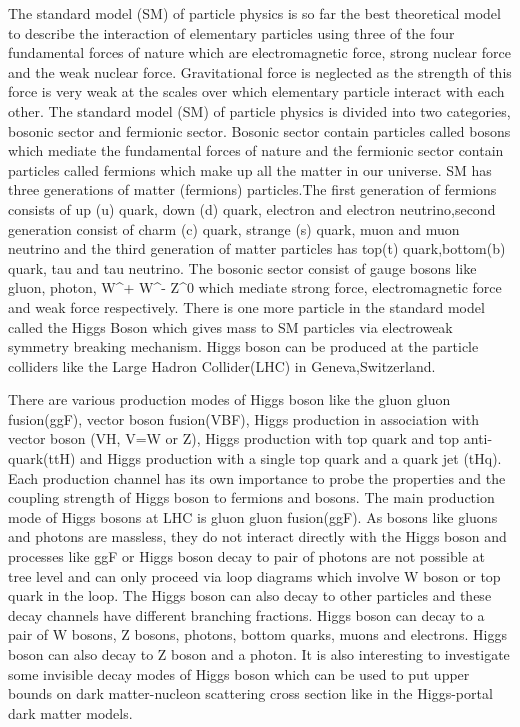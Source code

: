 \documentclass[final,3p]{CSP}
\begin{document}
The standard model (SM) of particle physics is so far the best theoretical model to describe the interaction of elementary 
particles using three of the four fundamental forces of nature which are electromagnetic force, strong nuclear force and the weak
nuclear force. Gravitational force is neglected as the strength of this force is very weak at the scales over which elementary 
particle interact with each other. The standard model (SM) of particle physics is divided into two categories, bosonic sector 
and fermionic sector. Bosonic sector contain particles called bosons which mediate the fundamental forces of nature and the
fermionic sector contain particles called fermions which make up all the matter in our universe. SM has three generations of 
matter (fermions) particles.The first generation of fermions consists of up (u) quark, down (d) quark, electron and electron 
neutrino,second generation consist of charm (c) quark, strange (s) quark, muon and muon neutrino and the third generation of matter 
particles has top(t) quark,bottom(b) quark, tau and tau neutrino. The bosonic sector consist of gauge bosons like gluon, photon, 
W^+ W^- Z^0 which mediate strong force, electromagnetic force and weak force respectively. There is one more particle in the 
standard model called the Higgs Boson which gives mass to SM particles via electroweak symmetry breaking mechanism. Higgs boson 
can be produced at the particle colliders like the Large Hadron Collider(LHC) in Geneva,Switzerland. 

There are various production modes of Higgs boson like the gluon gluon fusion(ggF), vector boson fusion(VBF), Higgs production 
in association with vector boson (VH, V=W or Z), Higgs production with top quark and top anti-quark(ttH) and Higgs production with 
a single top quark and a quark jet (tHq). Each production channel has its own importance to probe the properties and the coupling 
strength of Higgs boson to fermions and bosons. The main production mode of Higgs bosons at LHC is gluon gluon fusion(ggF). As 
bosons like gluons and photons are massless, they do not interact directly with the Higgs boson and processes like ggF or Higgs 
boson decay to pair of photons are not possible at tree level and can only proceed via loop diagrams which involve W boson or top 
quark in the loop. The Higgs boson can also decay to other particles and these decay channels have different branching fractions. 
Higgs boson can decay to a pair of W bosons, Z bosons, photons, bottom quarks, muons and electrons. Higgs boson can also decay to 
Z boson and a photon. It is also interesting to investigate some invisible decay modes of Higgs boson which can be used to put 
upper bounds on dark matter-nucleon scattering cross section like in the Higgs-portal dark matter models. 
\end{document}
